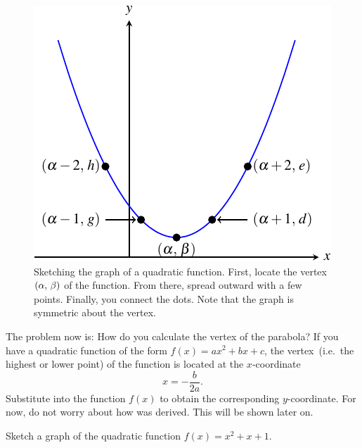 \documentclass[a4paper,oneside,12pt]{article}
\begin{document}
\begin{figure}[!htbp]
\centering
\includegraphics[scale=1.2]{image/08/a1-bminus4-c10.pdf}
\caption{%
  Sketching the graph of a quadratic function.  First, locate the
  vertex $\left\lparen{\alpha},\, {\beta}\right\rparen$ of the function.  From there, spread
  outward with a few points.  Finally, you connect the dots.  Note
  that the graph is symmetric about the vertex.
}
\label{fig:sketch_parabola}
\end{figure}

The problem now is: How do you calculate the vertex of the parabola?
If you have a quadratic function of the form $f(x) = ax^2 + bx + c$,
the vertex~(i.e.~the highest or lower point) of the function is
located at the $x$-coordinate
\begin{equation}
\label{eqn:parabola_tip_x_coordinate}
x
=
-\frac{b}{2a}.
\end{equation}
Substitute  into the
function $f(x)$ to obtain the corresponding $y$-coordinate.  For now,
do not worry about how  was
derived.  This will be shown later on.

\begin{example}
\label{ex:quadratic_graph_a1_b1_c1}
Sketch a graph of the quadratic function $f(x) = x^2 + x + 1$.
\end{example}
\end{document}
